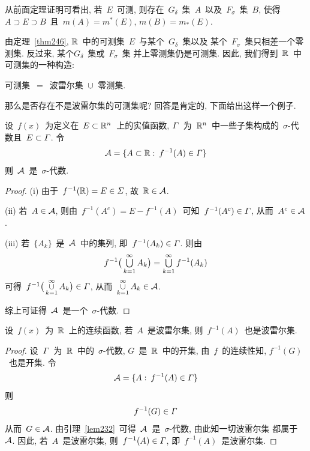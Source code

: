 \begin{remark}
从前面定理证明可看出, 若~$E$~可测, 则存在~$G_\delta$~集~$A$~以及~$F_\sigma$~集~$B$,
使得~$A \supset E \supset B$~且~$m(A) = m^*(E),\, m(B) = m_*(E)$.
\end{remark}

由定理~\ref{thm246}, $\mathbb{R}$~中的可测集~$E$~与某个~$G_\delta$~集以及
某个~$F_\sigma$~集只相差一个零测集. 反过来, 某个$G_\delta$~集或~$F_\sigma$~集
并上零测集仍是可测集. 因此, 我们得到~$\mathbb{R}$~中可测集的一种构造:

\begin{theorem}
可测集~$=$~波雷尔集~$\mathop{\cup}$~零测集.
\end{theorem}

那么是否存在不是波雷尔集的可测集呢? 回答是肯定的, 下面给出这样一个例子.

\begin{lemma} \label{lem232}
设~$f(x)$~为定义在~$E \subset \mathbb{R}^n$~上的实值函数, ${\mathnormal\Gamma}$~为~$\mathbb{R}^n$~中一些子集构成的~$\sigma$-代数且~$E \subset {\mathnormal\Gamma}$. 令
\[
\mathcal{A}=\{A \subset \mathbb{R}: \: f^{-1}(A) \in {\mathnormal\Gamma}\}
\]
则~$\mathcal{A}$~是~$\sigma$-代数.
\end{lemma}

\begin{proof}
(i) 由于~$f^{-1}(\mathbb{R})=E \in {\mathnormal\Sigma}$, 故~$\mathbb{R} \in \mathcal{A}$.

(ii) 若~$A \in \mathcal{A}$, 则由~$f^{-1}(A^c)=E-f^{-1}(A)$~可知~$f^{-1}(A^c) \in {\mathnormal\Gamma}$, 从而~$A^c \in \mathcal{A}$.

(iii) 若~$\{A_k\}$~是~$\mathcal{A}$~中的集列, 即~$f^{-1}(A_k) \in {\mathnormal\Gamma}$. 则由
\[
f^{-1}\big( \mathop{\textstyle{\bigcup}}_{k=1}^\infty A_k \big) = \mathop{\textstyle{\bigcup}}_{k=1}^\infty f^{-1}(A_k)
\]
可得~$f^{-1}\big( \mathop{\cup}\limits_{k=1}^\infty A_k \big) \in {\mathnormal\Gamma}$, 从而~$\mathop{\cup}\limits_{k=1}^\infty A_k \in \mathcal{A}$.

\medskip

综上可证得~$\mathcal{A}$~是一个~$\sigma$-代数.
\end{proof}

\begin{corollary} \label{cor232}
设~$f(x)$~为~$\mathbb{R}$~上的连续函数, 若~$A$~是波雷尔集,
则~$f^{-1}(A)$~也是波雷尔集.
\end{corollary}

\begin{proof}
设~${\mathnormal\Gamma}$~为~$\mathbb{R}$~中的~$\sigma$-代数, $G$~是~$\mathbb{R}$~中的开集,
由~$f$~的连续性知, $f^{-1}(G)$~也是开集. 令
\[
\mathcal{A}=\{A: \: f^{-1}(A) \in {\mathnormal\Gamma}\}
\]
则
\[
f^{-1}(G) \in {\mathnormal\Gamma}
\]
从而~$G \in \mathcal{A}$. 由引理~\ref{lem232}~可得~$\mathcal{A}$~是~$\sigma$-代数, 由此知一切波雷尔集
都属于~$\mathcal{A}$. 因此, 若~$A$~是波雷尔集, 则~$f^{-1}(A) \in {\mathnormal\Gamma}$, 即~$f^{-1}(A)$~是波雷尔集.
\end{proof}

